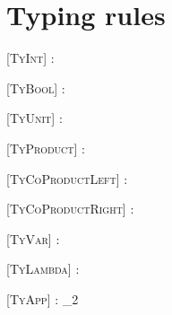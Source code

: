 \chapter{Typing rules}

\begin{prooftree*}
  [\scshape TyInt]{\Gamma \vdash {} : }
\end{prooftree*}

\begin{prooftree*}
  [\scshape TyBool]{\Gamma \vdash {} : }
\end{prooftree*}

\begin{prooftree*}
    [\scshape TyUnit]{\Gamma \vdash {} : }
\end{prooftree*}

\begin{prooftree*}
  [\scshape TyProduct]{\Gamma \vdash {} : }
\end{prooftree*}

\begin{prooftree*}
  [\scshape TyCoProductLeft]{\Gamma \vdash {} : }
\end{prooftree*}
\begin{prooftree*}
  [\scshape TyCoProductRight]{\Gamma \vdash {} : }
\end{prooftree*}

\begin{prooftree*}
  [\scshape TyVar]{\Gamma \vdash {} : \tau}
\end{prooftree*}

\begin{prooftree*}
  [\scshape TyLambda]{\Gamma \vdash {} : }
\end{prooftree*}

\begin{prooftree*}
  [\scshape TyApp]{\Gamma \vdash {} : \tau_2}
\end{prooftree*}

